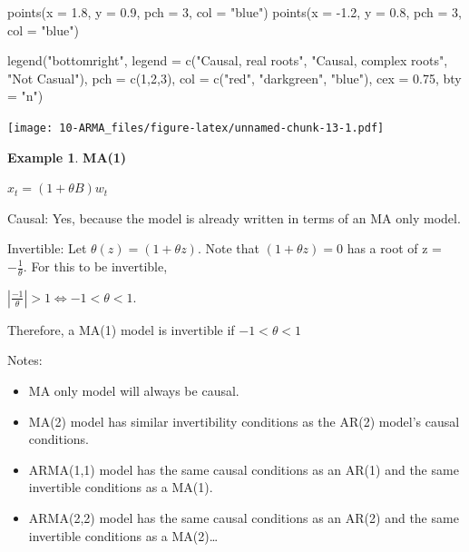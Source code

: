 \documentclass[
]{book}
\newenvironment{Shaded}{\begin{snugshade}}{\end{snugshade}}
\newcommand{\AttributeTok}[1]{\textcolor[rgb]{0.77,0.63,0.00}{#1}}
\newcommand{\DecValTok}[1]{\textcolor[rgb]{0.00,0.00,0.81}{#1}}
\newcommand{\FloatTok}[1]{\textcolor[rgb]{0.00,0.00,0.81}{#1}}
\newcommand{\FunctionTok}[1]{\textcolor[rgb]{0.00,0.00,0.00}{#1}}
\newcommand{\NormalTok}[1]{#1}
\newcommand{\SpecialCharTok}[1]{\textcolor[rgb]{0.00,0.00,0.00}{#1}}
\newcommand{\StringTok}[1]{\textcolor[rgb]{0.31,0.60,0.02}{#1}}
\providecommand{\tightlist}{%
  \setlength{\itemsep}{0pt}\setlength{\parskip}{0pt}}
\theoremstyle{definition}
\theoremstyle{definition}
\newtheorem{example}{Example}[chapter]
\theoremstyle{definition}
\theoremstyle{definition}
\theoremstyle{remark}
\begin{document}
\begin{Shaded}
\begin{Highlighting}[]
\FunctionTok{points}\NormalTok{(}\AttributeTok{x =} \FloatTok{1.8}\NormalTok{, }\AttributeTok{y =} \FloatTok{0.9}\NormalTok{, }\AttributeTok{pch =} \DecValTok{3}\NormalTok{, }\AttributeTok{col =} \StringTok{"blue"}\NormalTok{)}
\FunctionTok{points}\NormalTok{(}\AttributeTok{x =} \SpecialCharTok{{-}}\FloatTok{1.2}\NormalTok{, }\AttributeTok{y =} \FloatTok{0.8}\NormalTok{, }\AttributeTok{pch =} \DecValTok{3}\NormalTok{, }\AttributeTok{col =} \StringTok{"blue"}\NormalTok{)}

\FunctionTok{legend}\NormalTok{(}\StringTok{"bottomright"}\NormalTok{, }\AttributeTok{legend =} \FunctionTok{c}\NormalTok{(}\StringTok{"Causal, real roots"}\NormalTok{, }
      \StringTok{"Causal, complex roots"}\NormalTok{, }\StringTok{"Not Casual"}\NormalTok{), }\AttributeTok{pch =} 
      \FunctionTok{c}\NormalTok{(}\DecValTok{1}\NormalTok{,}\DecValTok{2}\NormalTok{,}\DecValTok{3}\NormalTok{), }\AttributeTok{col =} \FunctionTok{c}\NormalTok{(}\StringTok{"red"}\NormalTok{, }\StringTok{"darkgreen"}\NormalTok{, }\StringTok{"blue"}\NormalTok{), }\AttributeTok{cex =} 
      \FloatTok{0.75}\NormalTok{, }\AttributeTok{bty =} \StringTok{"n"}\NormalTok{)}
\end{Highlighting}
\end{Shaded}

\texttt{[image: 10-ARMA\_files/figure-latex/unnamed-chunk-13-1.pdf]}

\begin{example}
\textbf{MA(1)}

\(x_t=(1+\theta B)w_t\)

Causal: Yes, because the model is already written in terms of an MA only model.

Invertible: Let \(\theta(z) = (1 + \theta z).\) Note that \((1 + \theta z) = 0\) has a root of z = \(-\frac{1}{\theta}.\) For this to be invertible,

\(|\frac{-1}{\theta}| > 1 \iff -1 < \theta < 1.\)

Therefore, a MA(1) model is invertible if \(-1 < \theta < 1\)
\end{example}

Notes:

\begin{itemize}
\tightlist
\item
  MA only model will always be causal.
\item
  MA(2) model has similar invertibility conditions as the AR(2) model's causal conditions.\\
\item
  ARMA(1,1) model has the same causal conditions as an AR(1) and the same invertible conditions as a MA(1).\\
\item
  ARMA(2,2) model has the same causal conditions as an AR(2) and the same invertible conditions as a MA(2)\ldots{}
\end{itemize}
\end{document}
